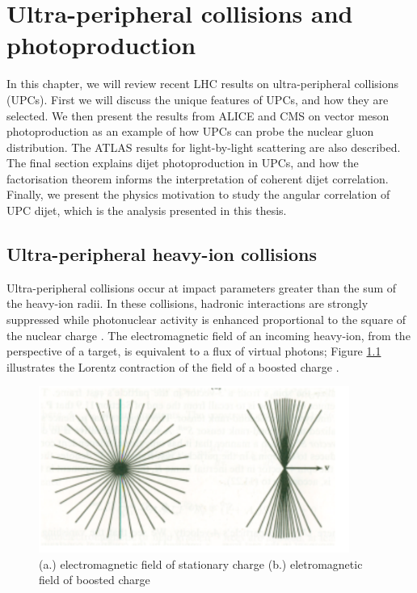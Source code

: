 \setlength\abovedisplayskip{0.4pt}
\setlength\belowdisplayskip{0.4pt}

\chapter{Ultra-peripheral collisions and photoproduction}

In this chapter, we will review recent LHC results on ultra-peripheral collisions (UPCs). First we will discuss the unique features of UPCs, and how they are selected. We then present the results from ALICE and CMS on vector meson photoproduction as an example of how UPCs can probe the nuclear gluon distribution. The ATLAS results for light-by-light scattering are also described. The final section explains dijet photoproduction in UPCs, and how the factorisation theorem informs the interpretation of coherent dijet correlation. Finally, we present the physics motivation to study the angular correlation of UPC dijet, which is the analysis presented in this thesis. 

\section{Ultra-peripheral heavy-ion collisions}

Ultra-peripheral collisions occur at impact parameters greater than the sum of the heavy-ion radii. In these collisions, hadronic interactions are strongly suppressed while photonuclear activity is enhanced proportional to the square of the nuclear charge \cite{Contreras:2015dqa}. The electromagnetic field of an incoming heavy-ion, from the perspective of a target, is equivalent to a flux of virtual photons; Figure \ref{fig:smushedField} illustrates the Lorentz contraction of the field of a boosted charge \cite{Baltz:2007kq,WWJackson}.

\begin{figure}[h!]
\begin{centering}
\includegraphics[width=4in]{Chapter1/importfigs/jackson_em_wwa.png}
\par\end{centering}
\caption{ (a.) electromagnetic field of stationary charge (b.) eletromagnetic field of boosted charge \cite{WWJackson} \label{fig:smushedField}}
\end{figure}

